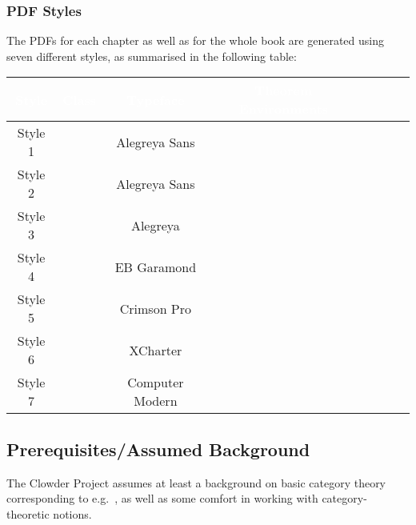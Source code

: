 \subsubsection{PDF Styles}\label{subsubsection-pdf-styles}
The PDFs for each chapter as well as for the whole book are generated using seven different styles, as summarised in the following table:
\begingroup%
\renewcommand{\arraystretch}{1.2}
\begin{center}
    \begin{tabular}{|Sc|Sc|Sc|Sc|}\hline{}
        \textcolor{white}{\textbf{Style}} & \textcolor{white}{\textbf{Class}} & \textcolor{white}{\textbf{Typeface}} & \textcolor{white}{\textbf{Theorem Environments}}\\\hline{}
        Style 1                           &                        & Alegreya Sans                        &                                    \\
        Style 2                           &                        & Alegreya Sans                        &                                    \\
        Style 3                           &                        & Alegreya                             &                                    \\
        Style 4                           &                        & EB Garamond                          &                                    \\
        Style 5                           &                        & Crimson Pro                          &                                    \\
        Style 6                           &                        & XCharter                             &                                    \\\hline
        Style 7                           &                        & Computer Modern                      &                                    \\\hline
    \end{tabular}
\end{center}
\endgroup
\subsection{Prerequisites/Assumed Background}\label{subsection-prerequisites-assumed-background}
The Clowder Project assumes at least a background on basic category theory corresponding to e.g.\ \cite{category-theory-in-context}, as well as some comfort in working with category-theoretic notions.
